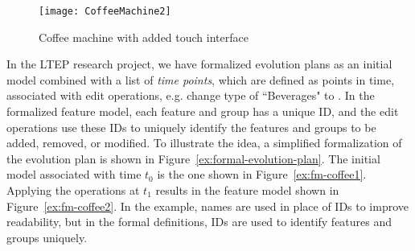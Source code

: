 \begin{figure}
   \begin{center}
      \texttt{[image: CoffeeMachine2]}
   \end{center}
   \caption[Coffee machine with added touch interface]{Coffee machine with added touch interface \footnotemark}
   \label{ex:fm-coffee2}
\end{figure}


In the LTEP research project, we have formalized evolution plans as an initial model combined with a list of \emph{time points}, which are defined as points in time, associated with edit operations, e.g. change type of ``Beverages" to \optional{}. In the formalized feature model, each feature and group has a unique ID, and the edit operations use these IDs to uniquely identify the features and groups to be added, removed, or modified. To illustrate the idea, a simplified formalization of the evolution plan is shown in Figure~\vref{ex:formal-evolution-plan}. The initial model associated with time $t_0$ is the one shown in Figure~\vref{ex:fm-coffee1}. Applying the operations at $t_1$ results in the feature model shown in Figure~\vref{ex:fm-coffee2}. In the example, names are used in place of IDs to improve readability, but in the formal definitions, IDs are used to identify features and groups uniquely. 

